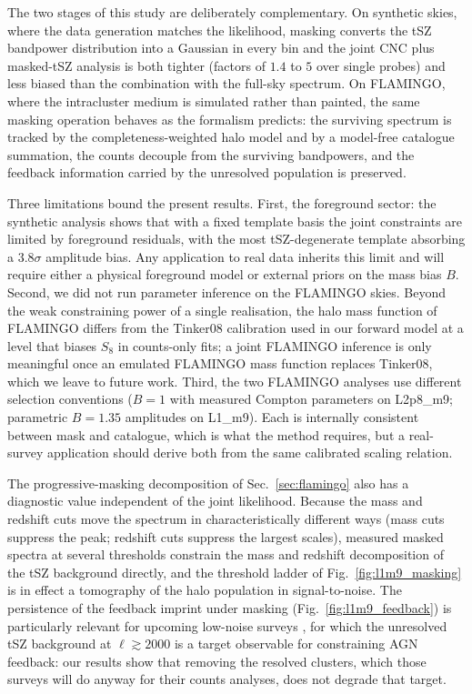 \documentclass[aps,prd,twocolumn,superscriptaddress,nofootinbib,floatfix]{revtex4-2}
\begin{document}
The two stages of this study are deliberately complementary.
On synthetic skies, where the data generation matches the likelihood, masking converts the tSZ bandpower distribution into a Gaussian in every bin and the joint CNC plus masked-tSZ analysis is both tighter (factors of $1.4$ to $5$ over single probes) and less biased than the combination with the full-sky spectrum.
On FLAMINGO, where the intracluster medium is simulated rather than painted, the same masking operation behaves as the formalism predicts: the surviving spectrum is tracked by the completeness-weighted halo model and by a model-free catalogue summation, the counts decouple from the surviving bandpowers, and the feedback information carried by the unresolved population is preserved.

Three limitations bound the present results.
First, the foreground sector: the synthetic analysis shows that with a fixed template basis the joint constraints are limited by foreground residuals, with the most tSZ-degenerate template absorbing a $3.8\sigma$ amplitude bias.
Any application to real data inherits this limit and will require either a physical foreground model or external priors on the mass bias $B$.
Second, we did not run parameter inference on the FLAMINGO skies.
Beyond the weak constraining power of a single realisation, the halo mass function of FLAMINGO differs from the Tinker08 calibration used in our forward model at a level that biases $S_8$ in counts-only fits; a joint FLAMINGO inference is only meaningful once an emulated FLAMINGO mass function replaces Tinker08, which we leave to future work.
Third, the two FLAMINGO analyses use different selection conventions ($B = 1$ with measured Compton parameters on L2p8\_m9; parametric $B = 1.35$ amplitudes on L1\_m9).
Each is internally consistent between mask and catalogue, which is what the method requires, but a real-survey application should derive both from the same calibrated scaling relation.

The progressive-masking decomposition of Sec.~\ref{sec:flamingo} also has a diagnostic value independent of the joint likelihood.
Because the mass and redshift cuts move the spectrum in characteristically different ways (mass cuts suppress the peak; redshift cuts suppress the largest scales), measured masked spectra at several thresholds constrain the mass and redshift decomposition of the tSZ background directly, and the threshold ladder of Fig.~\ref{fig:l1m9_masking} is in effect a tomography of the halo population in signal-to-noise.
The persistence of the feedback imprint under masking (Fig.~\ref{fig:l1m9_feedback}) is particularly relevant for upcoming low-noise surveys \citep{SimonsObservatory:2018koc,CMB-S4:2022ght}, for which the unresolved tSZ background at $\ell \gtrsim 2000$ is a target observable for constraining AGN feedback: our results show that removing the resolved clusters, which those surveys will do anyway for their counts analyses, does not degrade that target.
\end{document}
